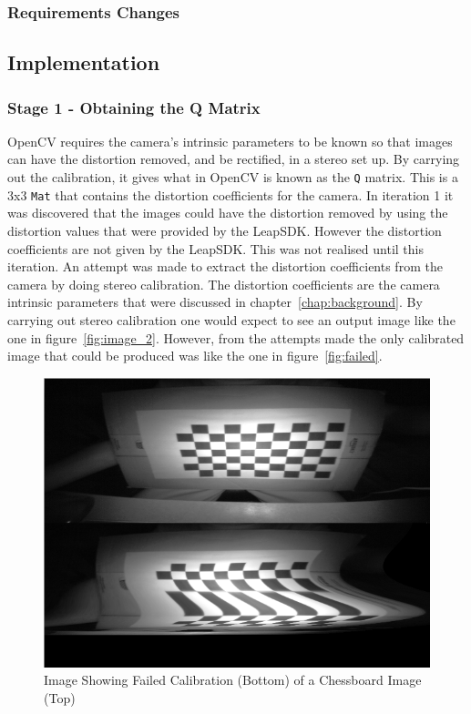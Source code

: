 \documentclass[11pt,oneside]{report}
\newcommand\code[1]{\texttt{#1}}
\begin{document}
			\subsubsection{Requirements Changes}
		\subsection{Implementation}
		\subsubsection{Stage 1 - Obtaining the Q Matrix}
			OpenCV requires the camera's intrinsic parameters to be known so that images can have the distortion removed, and be rectified, in a stereo set up.
			By carrying out the calibration, it gives what in OpenCV is known as the \code{Q} matrix.
			This is a 3x3 \code{Mat} that contains the distortion coefficients for the camera.
			In iteration 1 it was discovered that the images could have the distortion removed by using the distortion values that were provided by the LeapSDK.
			However the distortion coefficients are not given by the LeapSDK.
			This was not realised until this iteration.
			An attempt was made to extract the distortion coefficients from the camera by doing stereo calibration.
			The distortion coefficients are the camera intrinsic parameters that were discussed in chapter~\ref{chap:background}.
			By carrying out stereo calibration one would expect to see an output image like the one in figure~\ref{fig:image_2}.
			However, from the attempts made the only calibrated image that could be produced was like the one in figure~\ref{fig:failed}.
			\begin{figure}
		\centering
    			\includegraphics[width=\textwidth]{failed_attempt}
    			\caption{Image Showing Failed Calibration (Bottom) of a Chessboard Image (Top) \protect {\label{fig:failed}}}
			
		\end{figure}	
\end{document}
